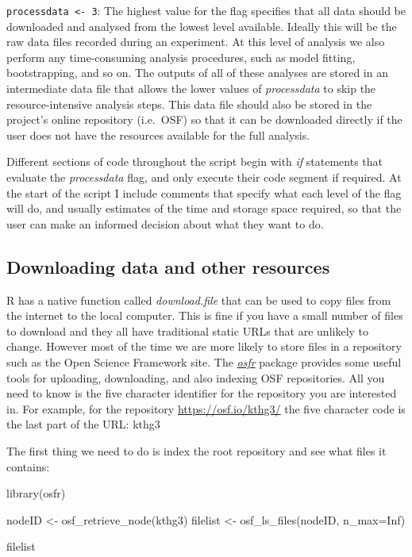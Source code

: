 \documentclass[
]{article}
\newenvironment{Shaded}{\begin{snugshade}}{\end{snugshade}}
\newcommand{\AttributeTok}[1]{\textcolor[rgb]{0.77,0.63,0.00}{#1}}
\newcommand{\ConstantTok}[1]{\textcolor[rgb]{0.00,0.00,0.00}{#1}}
\newcommand{\FunctionTok}[1]{\textcolor[rgb]{0.00,0.00,0.00}{#1}}
\newcommand{\NormalTok}[1]{#1}
\newcommand{\OtherTok}[1]{\textcolor[rgb]{0.56,0.35,0.01}{#1}}
\newcommand{\StringTok}[1]{\textcolor[rgb]{0.31,0.60,0.02}{#1}}
\begin{document}
\texttt{processdata\ \textless{}-\ 3}: The highest value for the flag specifies that all data should be downloaded and analysed from the lowest level available. Ideally this will be the raw data files recorded during an experiment. At this level of analysis we also perform any time-consuming analysis procedures, such as model fitting, bootstrapping, and so on. The outputs of all of these analyses are stored in an intermediate data file that allows the lower values of \emph{processdata} to skip the resource-intensive analysis steps. This data file should also be stored in the project's online repository (i.e.~OSF) so that it can be downloaded directly if the user does not have the resources available for the full analysis.

Different sections of code throughout the script begin with \emph{if} statements that evaluate the \emph{processdata} flag, and only execute their code segment if required. At the start of the script I include comments that specify what each level of the flag will do, and usually estimates of the time and storage space required, so that the user can make an informed decision about what they want to do.

\hypertarget{downloading-data-and-other-resources}{%
\subsection{Downloading data and other resources}\label{downloading-data-and-other-resources}}

R has a native function called \emph{download.file} that can be used to copy files from the internet to the local computer. This is fine if you have a small number of files to download and they all have traditional static URLs that are unlikely to change. However most of the time we are more likely to store files in a repository such as the Open Science Framework site. The \href{https://cran.r-project.org/package=osfr}{\emph{osfr}} package provides some useful tools for uploading, downloading, and also indexing OSF repositories. All you need to know is the five character identifier for the repository you are interested in. For example, for the repository \url{https://osf.io/kthg3/} the five character code is the last part of the URL: kthg3

The first thing we need to do is index the root repository and see what files it contains:

\begin{Shaded}
\begin{Highlighting}[]
\FunctionTok{library}\NormalTok{(osfr)}

\NormalTok{nodeID }\OtherTok{\textless{}{-}} \FunctionTok{osf\_retrieve\_node}\NormalTok{(}\StringTok{\textquotesingle{}kthg3\textquotesingle{}}\NormalTok{)}
\NormalTok{filelist }\OtherTok{\textless{}{-}} \FunctionTok{osf\_ls\_files}\NormalTok{(nodeID, }\AttributeTok{n\_max=}\ConstantTok{Inf}\NormalTok{)}

\NormalTok{filelist}
\end{Highlighting}
\end{Shaded}
\end{document}
